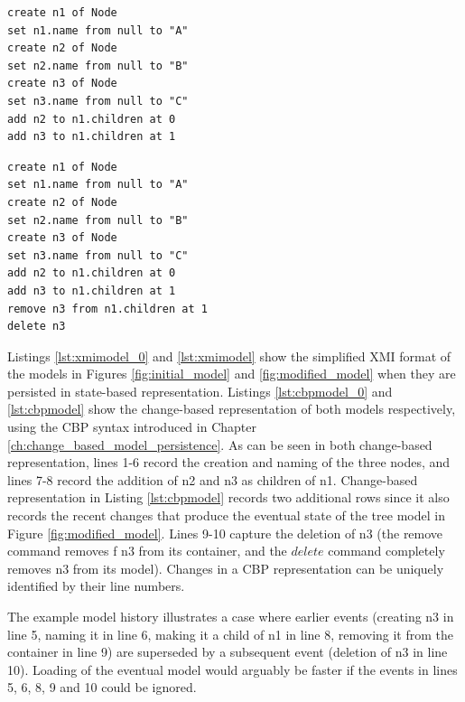 \vspace{-20pt}
\begin{minipage}[t]{0.49\linewidth}
\begin{lstlisting}[style=eol,caption={Change-based representation of the tree model in Figure \ref{fig:initial_model}.},label=lst:cbpmodel_0]
create n1 of Node
set n1.name from null to "A"  
create n2 of Node
set n2.name from null to "B"  
create n3 of Node
set n3.name from null to "C"  
add n2 to n1.children at 0  
add n3 to n1.children at 1
\end{lstlisting}
\end{minipage}
\hfill
\begin{minipage}[t]{0.49\linewidth}
  \begin{lstlisting}[style=eol,caption={Change-based representation of the tree model in Figure \ref{fig:modified_model}.},label=lst:cbpmodel]
create n1 of Node
set n1.name from null to "A"  
create n2 of Node
set n2.name from null to "B"  
create n3 of Node
set n3.name from null to "C"  
add n2 to n1.children at 0  
add n3 to n1.children at 1
remove n3 from n1.children at 1
delete n3
\end{lstlisting}
\end{minipage}

Listings \ref{lst:xmimodel_0} and \ref{lst:xmimodel} show the simplified XMI format of the models in Figures \ref{fig:initial_model} and \ref{fig:modified_model} when they are persisted in state-based representation. Listings \ref{lst:cbpmodel_0} and \ref{lst:cbpmodel} show the change-based representation of both models respectively, using the CBP syntax introduced in Chapter \ref{ch:change_based_model_persistence}. As can be seen in both change-based representation, lines 1-6 record the creation and naming of the three nodes, and lines 7-8 record the addition of \textsf{n2} and \textsf{n3} as children of \textsf{n1}. Change-based representation in Listing \ref{lst:cbpmodel} records two additional rows since it also records the recent changes that produce the eventual state of the tree model in Figure \ref{fig:modified_model}. Lines 9-10 capture the deletion of \textsf{n3} (the \textsf{remove} command removes f \textsf{n3} from its container, and the $delete$ command completely removes \textsf{n3} from its model). Changes in a CBP representation can be uniquely identified by their line numbers.

The example model history illustrates a case where  earlier events (creating \textsf{n3} in line 5, naming it in line 6, making it a child of \textsf{n1} in line 8, removing it from the container in line 9) are superseded by a subsequent event (deletion of \textsf{n3} in line 10).  Loading of the eventual model would arguably be faster if the events in lines 5, 6, 8, 9 and 10 could be ignored.

